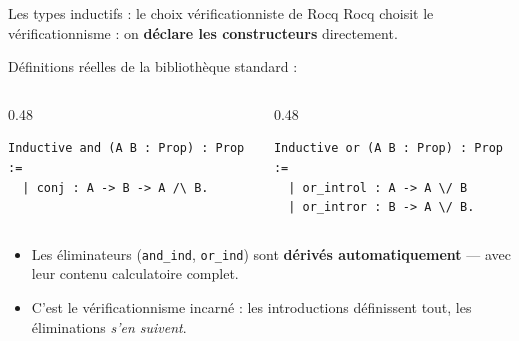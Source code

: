 \documentclass[aspectratio=169]{beamer}
\begin{document}
\begin{frame}[fragile]{Les types inductifs : le choix vérificationniste de Rocq}
  Rocq choisit le vérificationnisme : on \textbf{déclare les constructeurs} directement.
  \medskip

  Définitions réelles de la bibliothèque standard :
  \medskip
  \begin{columns}
    \begin{column}{0.48\textwidth}
\begin{verbatim}
Inductive and (A B : Prop) : Prop :=
  | conj : A -> B -> A /\ B.
\end{verbatim}
    \end{column}
    \begin{column}{0.48\textwidth}
\begin{verbatim}
Inductive or (A B : Prop) : Prop :=
  | or_introl : A -> A \/ B
  | or_intror : B -> A \/ B.
\end{verbatim}
    \end{column}
  \end{columns}
  \medskip
  \begin{itemize}
      \pause
    \item Les éliminateurs (\texttt{and\_ind}, \texttt{or\_ind})
      sont \textbf{dérivés automatiquement} — avec leur contenu calculatoire complet.
      \pause
    \item C'est le vérificationnisme incarné : les introductions définissent tout,
      les éliminations \emph{s'en suivent}.
  \end{itemize}
\end{frame}
\end{document}

